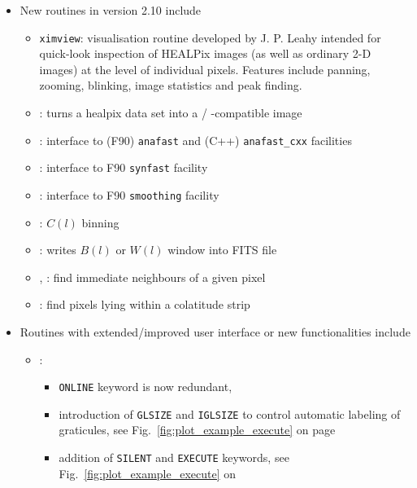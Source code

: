 \documentclass[12pt,twoside]{article}
\renewcommand{\ell}{l}
\begin{document}
{\begin{itemize}
%
\item New routines in version 2.10 include
\begin{itemize}
 \item {{\tt ximview}}: visualisation routine developed by J. P. Leahy intended for quick-look inspection of HEALPix images 
(as well as ordinary 2-D images) at the level of individual pixels. Features
include panning, zooming, blinking, image statistics and peak finding.
 \item {}: turns a healpix data set into a
%
/%
%
-compatible image
 \item {}: interface to (F90) {\tt anafast}
and (C++) {\tt anafast\_cxx} facilities 
 \item {}: interface to F90 {\tt synfast} facility
 \item {}: interface to F90 {\tt smoothing} facility
 \item {}: $C(\ell)$ binning
 \item {}: writes $B(\ell)$ or $W(\ell)$ window into
FITS file
 \item {}, %
       : %
   find immediate neighbours of a given pixel
 \item {}: %
   find pixels lying within a colatitude strip
\end{itemize}	
%
\item Routines with extended/improved user interface or new functionalities include
\begin{itemize}
\item {}: 
\begin{itemize}
\item {\tt ONLINE} keyword is now redundant, 
\item introduction of {\tt GLSIZE} and {\tt IGLSIZE} to
  	control automatic labeling of graticules,
	see Fig.~\ref{fig:plot_example_execute} on page~\pageref{page:plot_example_execute}
\item addition of {\tt SILENT} and {\tt EXECUTE} keywords,
	see Fig.~\ref{fig:plot_example_execute} on

\end{itemize}
\end{itemize}
\end{itemize}}
\end{document}
